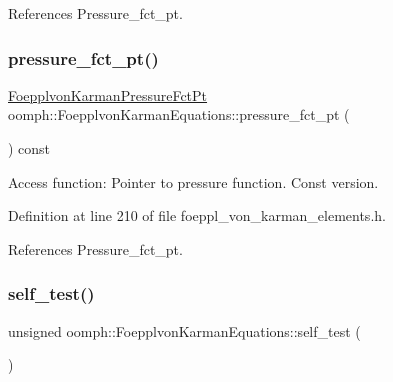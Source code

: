 References Pressure\+\_\+fct\+\_\+pt.

\mbox{\label{classoomph_1_1FoepplvonKarmanEquations_a1a297b4c850ac603c4bdb4f3a4e9fe72}} 
\subsubsection{\texorpdfstring{pressure\+\_\+fct\+\_\+pt()}{pressure\_fct\_pt()}\hspace{0.1cm}{\footnotesize\ttfamily [2/2]}}
{\footnotesize\ttfamily \hyperlink{classoomph_1_1FoepplvonKarmanEquations_a39b64f9712ec34f455beb9f4271ff297}{Foepplvon\+Karman\+Pressure\+Fct\+Pt} oomph\+::\+Foepplvon\+Karman\+Equations\+::pressure\+\_\+fct\+\_\+pt (\begin{DoxyParamCaption}{ }\end{DoxyParamCaption}) const\hspace{0.3cm}{\ttfamily [inline]}}



Access function\+: Pointer to pressure function. Const version. 



Definition at line 210 of file foeppl\+\_\+von\+\_\+karman\+\_\+elements.\+h.



References Pressure\+\_\+fct\+\_\+pt.

\mbox{\label{classoomph_1_1FoepplvonKarmanEquations_a9aa68e9f999db1fe746f13a6b6a02b73}} 
\subsubsection{\texorpdfstring{self\+\_\+test()}{self\_test()}}
{\footnotesize\ttfamily unsigned oomph\+::\+Foepplvon\+Karman\+Equations\+::self\+\_\+test (\begin{DoxyParamCaption}{ }\end{DoxyParamCaption})\hspace{0.3cm}{\ttfamily [virtual]}}



